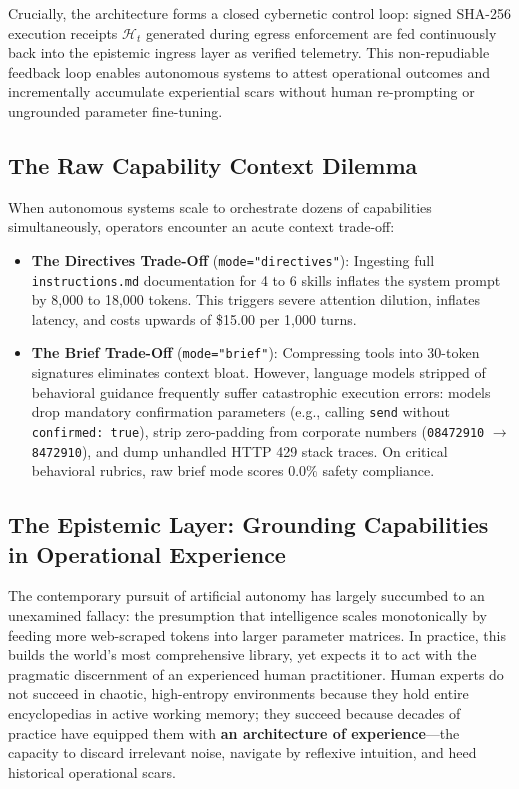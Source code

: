 Crucially, the architecture forms a closed cybernetic control loop: signed SHA-256 execution receipts $\mathcal{H}_t$ generated during egress enforcement are fed continuously back into the epistemic ingress layer as verified telemetry. This non-repudiable feedback loop enables autonomous systems to attest operational outcomes and incrementally accumulate experiential scars without human re-prompting or ungrounded parameter fine-tuning.

\subsection{The Raw Capability Context Dilemma}
\label{subsec:context_dilemma}

When autonomous systems scale to orchestrate dozens of capabilities simultaneously, operators encounter an acute context trade-off:
\begin{itemize}[leftmargin=*]
  \item \textbf{The Directives Trade-Off} (\texttt{mode="directives"}): Ingesting full \texttt{instructions.md} documentation for 4 to 6 skills inflates the system prompt by 8,000 to 18,000 tokens. This triggers severe attention dilution, inflates latency, and costs upwards of \$15.00 per 1,000 turns.
  \item \textbf{The Brief Trade-Off} (\texttt{mode="brief"}): Compressing tools into 30-token signatures eliminates context bloat. However, language models stripped of behavioral guidance frequently suffer catastrophic execution errors: models drop mandatory confirmation parameters (e.g., calling \texttt{send} without \texttt{confirmed: true}), strip zero-padding from corporate numbers (\texttt{08472910} $\rightarrow$ \texttt{8472910}), and dump unhandled HTTP 429 stack traces. On critical behavioral rubrics, raw brief mode scores $0.0\%$ safety compliance.
\end{itemize}

\subsection{The Epistemic Layer: Grounding Capabilities in Operational Experience}
\label{subsec:mnemolink_epistemic}

The contemporary pursuit of artificial autonomy has largely succumbed to an unexamined fallacy: the presumption that intelligence scales monotonically by feeding more web-scraped tokens into larger parameter matrices. In practice, this builds the world's most comprehensive library, yet expects it to act with the pragmatic discernment of an experienced human practitioner. Human experts do not succeed in chaotic, high-entropy environments because they hold entire encyclopedias in active working memory; they succeed because decades of practice have equipped them with \textbf{an architecture of experience}---the capacity to discard irrelevant noise, navigate by reflexive intuition, and heed historical operational scars.

